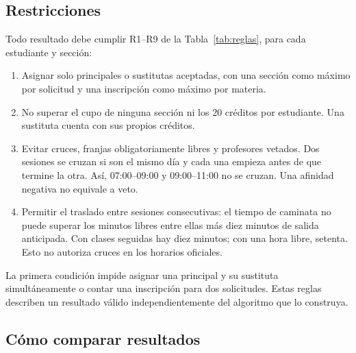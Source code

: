 \subsection{Restricciones}

Todo resultado debe cumplir R1--R9 de la Tabla~\ref{tab:reglas}, para cada estudiante y sección:
\begin{enumerate}
\item Asignar solo principales o sustitutas aceptadas, con una sección como máximo por solicitud y una inscripción como máximo por materia.
\item No superar el cupo de ninguna sección ni los 20 créditos por estudiante. Una sustituta cuenta con sus propios créditos.
\item Evitar cruces, franjas obligatoriamente libres y profesores vetados. Dos sesiones se cruzan si son el mismo día y cada una empieza antes de que termine la otra. Así, 07:00--09:00 y 09:00--11:00 no se cruzan. Una afinidad negativa no equivale a veto.
\item Permitir el traslado entre sesiones consecutivas: el tiempo de caminata no puede superar los minutos libres entre ellas más diez minutos de salida anticipada. Con clases seguidas hay diez minutos; con una hora libre, setenta. Esto no autoriza cruces en los horarios oficiales.
\end{enumerate}

La primera condición impide asignar una principal y su sustituta simultáneamente o contar una inscripción para dos solicitudes. Estas reglas describen un resultado válido independientemente del algoritmo que lo construya.

\subsection{Cómo comparar resultados}\label{sec:objetivo}

